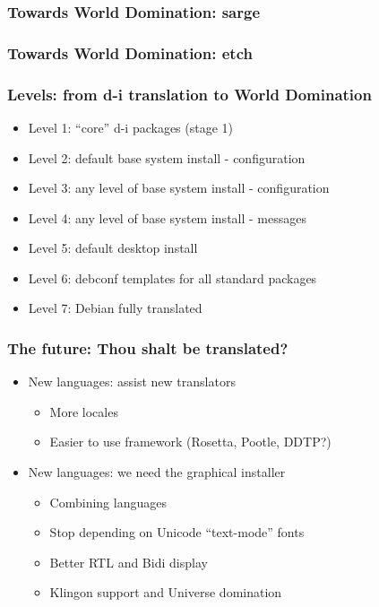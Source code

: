 \documentclass{beamer}
\begin{document}
\begin{frame}
  \frametitle{Towards World Domination: sarge}
\end{frame}

\begin{frame}
  \frametitle{Towards World Domination: etch}
\end{frame}

\begin{frame}
  \frametitle{Levels: from d-i translation to World Domination}
	\begin{itemize}
	\item
		Level 1: ``core'' d-i packages (stage 1)
	\item
		Level 2: default base system install - configuration
	\item
		Level 3: any level of base system install - configuration
	\item
		Level 4: any level of base system install - messages
	\item
		Level 5: default desktop install
	\item
		Level 6: debconf templates for all standard packages
	\item
		Level 7: Debian fully translated
	\end{itemize}
\end{frame}

\begin{frame}
  \frametitle{The future: Thou shalt be translated?}
	\begin{itemize}
	\item
		New languages: assist new translators
		\begin{itemize}
			\item
				More locales
			\item
				Easier to use framework (Rosetta, Pootle, DDTP?)
		\end{itemize}
	\item
		New languages: we need the graphical installer
		\begin{itemize}
			\item
				Combining languages
			\item
				Stop depending on Unicode ``text-mode'' fonts
			\item
				Better RTL and Bidi display
			\item
				Klingon support and Universe domination
		\end{itemize}
	\end{itemize}
\end{frame}
\end{document}
